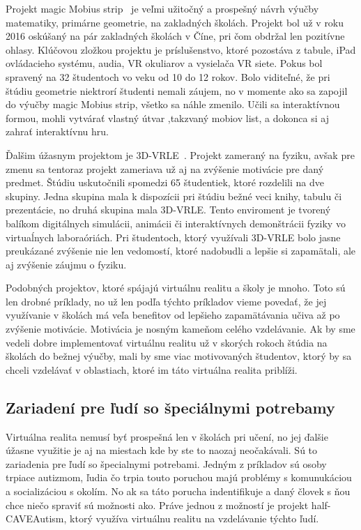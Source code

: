 \documentclass[10pt,twoside,slovak,a4paper]{article}
\begin{document}
Projekt magic Mobius strip~\cite{Math} je veľmi užitočný a prospešný návrh výučby matematiky, primárne geometrie, na zakladných školách. Projekt bol už v roku 2016 oskúšaný na pár zakladných školách v Číne, pri čom obdržal len pozitívne ohlasy. Klúčovou zložkou projektu je príslušenstvo, ktoré pozostáva z tabule, iPad ovládacieho systému, audia, VR okuliarov a vysielača VR siete. Pokus bol spravený na 32 študentoch vo veku od 10 do 12 rokov. Bolo viditeľné, že pri štúdiu geometrie niektrorí študenti nemali záujem, no v momente ako sa zapojil do výučby magic Mobius strip, všetko sa náhle zmenilo. Učili sa interaktívnou formou, mohli vytvárať vlastný útvar ,takzvaný mobiov list, a dokonca si aj zahrať interaktívnu hru.

Ďalšim úžasnym projektom je 3D-VRLE~\cite{Physics}. Projekt zameraný na fyziku, avšak pre zmenu sa tentoraz projekt zameriava už aj na zvýšenie motivácie pre daný predmet. Štúdiu uskutočnili spomedzi 65 študentiek, ktoré rozdelili na dve skupiny. Jedna skupina mala k dispozícii pri štúdiu bežné veci knihy, tabulu či prezentácie, no druhá skupina mala 3D-VRLE. Tento enviroment je tvorený balíkom digitálnych simulácii, animácii či interaktívnych demonštrácii fyziky vo virtuaĺnych laboraóriách. Pri študentoch, ktorý využívali 3D-VRLE bolo jasne preukázané zvýšenie nie len vedomostí, ktoré nadobudli a lepšie si zapamätali, ale aj zvýšenie záujmu o fyziku.

Podobných projektov, ktoré spájajú virtuálnu realitu a školy je mnoho. Toto sú len drobné príklady, no už len podľa týchto príkladov vieme povedať, že jej využívanie v školách má veľa benefitov od lepšieho zapamätávania učiva až po zvýšenie motivácie. Motivácia je nosným kameňom celého vzdelávanie. Ak by sme vedeli dobre implementovať virtuálnu realitu už v skorých rokoch štúdia na školách do bežnej výučby, mali by sme viac motivovaných študentov, ktorý by sa chceli vzdelávať v oblastiach, ktoré im táto virtuálna realita priblíži.  


\subsection{Zariadení pre ľudí so špeciálnymi potrebamy} \label{školy:zariadenia}
Virtuálna realita nemusí byť prospešná len v školách pri učení, no jej ďalšie úžasne využitie je aj na miestach kde by ste to naozaj neočakávali. Sú to zariadenia pre ľudí so špecialnymi potrebami. Jedným z príkladov sú osoby trpiace autizmom, ľudia čo trpia touto poruchou majú problémy s komunukáciou a socializáciou s okolím. No ak sa táto porucha indentifikuje a daný človek s ňou chce niečo spraviť sú možnosti ako. Práve jednou z možností je projekt half-CAVEAutism, ktorý využíva virtuálnu realitu na vzdelávanie týchto ľudí.
\end{document}
